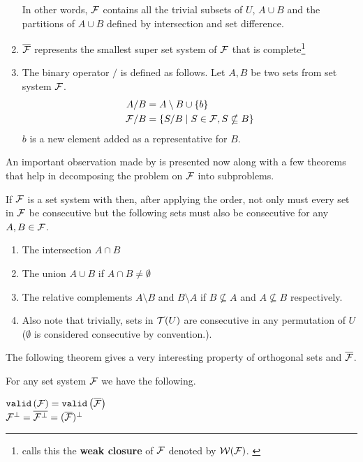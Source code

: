 \begin{definition}
\begin{enumerate}
    In other words, ${\cal F}$ contains all the trivial
    subsets of $U$, $A \cup B$ and the partitions of $A \cup B$
    defined by intersection and set difference.

  \item $\overline{{\cal F}}$ represents the smallest super set system of
    ${\cal F}$ that is complete\footnote{\cite[Def.~3.2]{mcc04} calls
      this the \textbf{ weak closure} of ${\cal F}$ denoted by
      ${\cal W}({\cal F})$. \label{mcc3}}

  \item \label{def::slashop} The binary operator $/$ is defined as
    follows. Let $A, B$ be two sets from set system ${\cal F}$.
    \begin{align*}
      A/B &= A \setminus B \cup \{b\}\\
      {\cal F}/B &= \{ S/B \mid S \in {\cal F}, S \nsubseteq B \}
    \end{align*}
    $b$ is a new element added as a representative for $B$.
 \end{enumerate}
  \dstop
\end{definition}


An important observation made by \cite{mm96} is presented now along
with a few theorems that help in decomposing the \COP problem on ${\cal F}$
into subproblems.

\begin{observation}[{\cite[Sec.~3]{mm96}}]
  If ${\cal F}$ is a set system with \COP then, after applying the \COP
  order, not only must every set in ${\cal F}$ be consecutive but the
  following sets must also be consecutive for any $A, B \in {\cal F}$.
\begin{enumerate}
  \item The intersection $A \cap B$ 
  \item The union $A \cup B$ if $A \cap B \ne \emptyset$
  \item The relative complements $A \setminus B$ and $B \setminus A$
    if $B \nsubseteq A$ and $A \nsubseteq B$ respectively.
  \item Also note that trivially, sets in ${\cal T}(U)$ are consecutive in
    any permutation of $U$ ($\emptyset$ is considered
      consecutive by convention.).
\end{enumerate}
\end{observation}

The following theorem gives a very interesting property of orthogonal
sets and $\overline{{\cal F}}$.

\begin{theoremsansproof}[{\cite[Th.~3,6]{mm96}}]
  \label{th:validcop}
  For any set system ${\cal F}$ we have the following. \par
  \centering
    ${\tt valid}\left({\cal F}\right) = {\tt valid}\left(\overline{{\cal F}}\right)$ \\
    ${\cal F}^{\bot} = \overline{{\cal F}^{\bot}} = (\overline{{\cal F}})^{\bot}$
\end{theoremsansproof}

